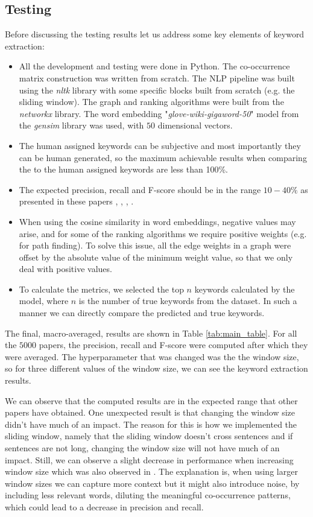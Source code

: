 \documentclass[12pt]{article}
\numberwithin{equation}{section}
\begin{document}
\begin{spacing}{1.5}
	\subsection{Testing}
	Before discussing the testing results let us address some key elements of keyword extraction:
	\begin{itemize}
		\item All the development and testing were done in Python. The co-occurrence matrix construction was written from scratch. The NLP pipeline was built using the \textit{nltk} library with some specific blocks built from scratch (e.g. the sliding window). The graph and ranking algorithms were built from the \textit{networkx} library. The word embedding "\textit{glove-wiki-gigaword-50}" model from the \textit{gensim} library was used, with $50$ dimensional vectors.
		\item The human assigned keywords can be subjective and most importantly they can be human generated, so the maximum achievable results when comparing the to the human assigned keywords are less than 100\%.
		\item The expected precision, recall and F-score should be in the range $10 - 40 \%$ as presented in these papers \cite{ying_yan}, \cite{mothe}, \cite{keyword-extraction-0}, \cite{textrank}.
		\item When using the cosine similarity in word embeddings, negative values may arise, and for some of the ranking algorithms we require positive weights (e.g. for path finding). To solve this issue, all the edge weights in a graph were offset by the absolute value of the minimum weight value, so that we only deal with positive values.
		\item To calculate the metrics, we selected the top $n$ keywords calculated by the model, where $n$ is the number of true keywords from the dataset. In such a manner we can directly compare the predicted and true keywords.
	\end{itemize}	
	The final, macro-averaged, results are shown in Table \ref{tab:main_table}. For all the $5000$ papers, the precision, recall and F-score were computed after which they were averaged. The hyperparameter that was changed was the the window size, so for three different values of the window size, we can see the keyword extraction results. 
	
	We can observe that the computed results are in the expected range that other papers have obtained. One unexpected result is that changing the window size didn't have much of an impact. The reason for this is how we implemented the sliding window, namely that the sliding window doesn't cross sentences and if sentences are not long, changing the window size will not have much of an impact. Still, we can observe a slight decrease in performance when increasing window size which was also observed in \cite{textrank}. The explanation is, when using larger window sizes we can capture more context but it might also introduce noise, by including less relevant words, diluting the meaningful co-occurrence patterns, which could lead to a decrease in precision and recall. 
	

\end{spacing}
\end{document}
